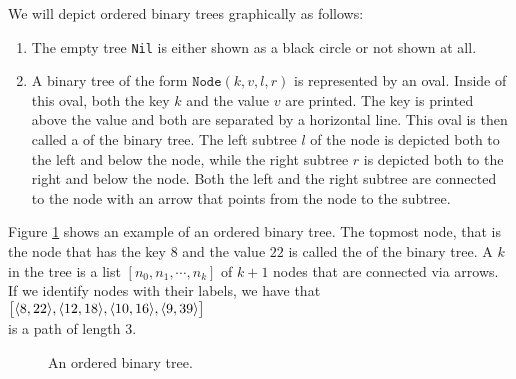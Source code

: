 \noindent
We will depict ordered binary trees graphically as follows:
\begin{enumerate}
\item The empty tree \texttt{Nil} is either shown as a black circle or not shown at all.
\item A binary tree of the form $\texttt{Node}(k,v,l,r)$ is represented by an oval.  Inside of this
      oval, both the key $k$ and the value $v$ are printed.  The key is printed above the value and
      both are separated by a horizontal line.  This oval is then called a
       of the binary tree. 
      The left subtree $l$ of the node is depicted both to the left and  below the node,
      while the right subtree $r$ is depicted both to the right and below the node.  Both the left
      and the right subtree are connected to the node with an arrow that points from the node to the
      subtree.
\end{enumerate}
Figure \ref{fig:graph1} shows an example of an ordered binary tree.  The topmost node, that is the
node that has the key $8$ and the value $22$ is called the  of the binary tree.
A  $k$ in the tree is a list $[n_0,n_1, \cdots, n_k]$ of
$k+1$ nodes that are connected via arrows.  If we identify nodes with their labels, we have that
\\[0.2cm]
\hspace*{1.3cm} $\bigl[ \pair(8,22), \pair(12,18), \pair(10,16), \pair(9,39) \bigr]$ \\[0.2cm]
is a path of length 3.


\begin{figure}[!ht]
  \centering
  \caption{An ordered binary tree.}
  \label{fig:graph1}
\end{figure}



